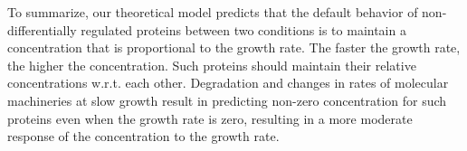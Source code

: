 To summarize, our theoretical model predicts that the default behavior of non-differentially regulated proteins between two conditions is to maintain a concentration that is proportional to the growth rate.
The faster the growth rate, the higher the concentration.
Such proteins should maintain their relative concentrations w.r.t. each other.
Degradation and changes in rates of molecular machineries at slow growth result in predicting non-zero concentration for such proteins even when the growth rate is zero, resulting in a more moderate response of the concentration to the growth rate.